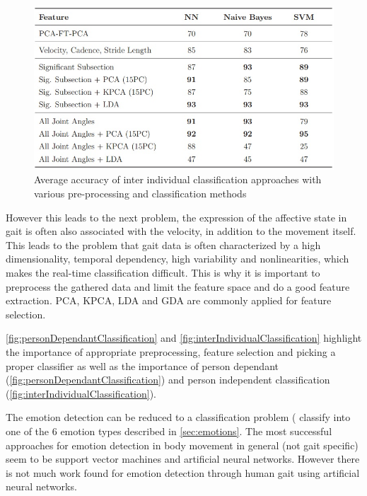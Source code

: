 \documentclass[conference]{IEEEtran}
\begin{document}
\begin{figure}
\centering
\includegraphics[width=\linewidth]{personDependantClassification.jpg}
\caption{Average accuracy of inter individual classification approaches with various pre-processing and classification methods\cite{karg2012pattern}}
\label{fig:personDependantClassification}
\end{figure}
However this leads to the next problem, the expression of the affective state in gait is often also associated with the velocity\cite{crane2007motion,pollick2001perceiving,roether2009critical}, in addition to the movement itself. This leads to the problem that gait data is often characterized by a high dimensionality, temporal dependency, high variability and nonlinearities\cite{karg2012pattern}, which makes the real-time classification difficult. This is why it is important to preprocess the gathered data and limit the feature space and do a good feature extraction. PCA, KPCA, LDA and GDA are commonly applied for feature selection\cite{karg2012pattern}.\

\autoref{fig:personDependantClassification} and \autoref{fig:interIndividualClassification} highlight the importance of appropriate preprocessing, feature selection and picking a proper classifier as well as the importance of person dependant (\autoref{fig:personDependantClassification}) and person independent classification (\autoref{fig:interIndividualClassification}).\

The emotion detection can be reduced to a classification problem ( classify into one of the 6 emotion types\cite{eckman2003emotions} described in \autoref{sec:emotions}. The most successful approaches for emotion detection in body movement in general (not gait specific) seem to be support vector machines\cite{karg2012pattern,schindler2008recognizing} and artificial neural networks\cite{karg2012pattern, kapur2005gesture}. However there is not much work found for emotion detection through human gait using artificial neural networks\cite{janssen2008recognition}.
\end{document}

